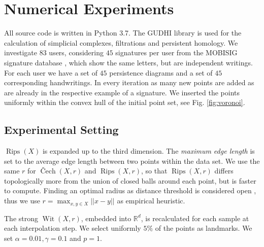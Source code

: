 \documentclass[runningheads]{llncs}
\DeclareMathOperator{\Cech}{\text{\v{C}ech}}
\DeclareMathOperator{\Rips}{\text{Rips}}
\DeclareMathOperator{\Wit}{\text{Wit}}
\begin{document}
\section{Numerical Experiments}
\label{sec:numexp}

All source code is written in Python 3.7. The GUDHI \cite{gudhi:urm} library is used for the calculation of simplicial complexes, filtrations and persistent homology. We investigate $83$ users, considering $45$ signatures per user from the MOBISIG signature database \cite{MOBISIG}, which show the same letters, but are independent writings. For each user we have a set of $45$ persistence diagrams and a set of $45$ corresponding handwritings. In every iteration as many new points are added as are already in the respective example of a signature. We inserted the points uniformly within the convex hull of the initial point set, see Fig. \ref{fig:voronoi}.

\subsection{Experimental Setting}
$\Rips(X)$ is expanded up to the third dimension. The \textit{maximum edge length} is set to the average edge length between two points within the data set. We use the same $r$ for $\Cech(X,r)$ and $\Rips(X,r)$, so that $\Rips(X,r)$ differs topologically more from the union of closed balls around each point, but is faster to compute. Finding an optimal radius as distance threshold is considered open \cite{ZomorodianC05}, thus we use $r = \max_{x,y \in X} ||x-y||$ as empirical heuristic.

The strong $\Wit(X,r)$, embedded into $\mathbb{R}^d$, is recalculated for each sample at each interpolation step. We select uniformly $5\%$ of the points as landmarks. We set $\alpha = 0.01, \gamma = 0.1$ and $p = 1$.
\end{document}

